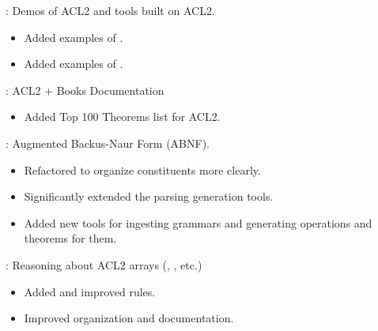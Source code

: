 
\begin{frame}

\implibtitle

:
Demos of ACL2 and tools built on ACL2.
\begin{itemize}
\item Added examples of .
\item Added examples of .
\end{itemize}
\end{frame}


\begin{frame}

\implibtitle

:
ACL2 + Books Documentation
\begin{itemize}
\item Added Top 100 Theorems list for ACL2.
\end{itemize}
\end{frame}


\begin{frame}

\implibtitle

:
Augmented Backus-Naur Form (ABNF).
\begin{itemize}
\item Refactored to organize constituents more clearly.
\item Significantly extended the parsing generation tools.
\item Added new tools for ingesting grammars
      and generating operations and theorems for them.
\end{itemize}

\end{frame}


\begin{frame}

\implibtitle

:
Reasoning about ACL2 arrays (, , etc.)
\begin{itemize}
\item Added and improved rules.
\item Improved organization and documentation.
\end{itemize}

\end{frame}

